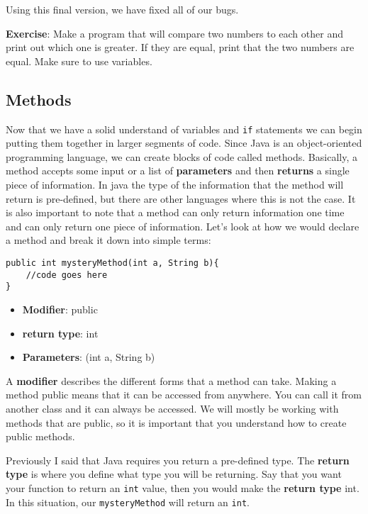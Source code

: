\documentclass[11pt,fleqn]{article}
\begin{document}
Using this final version, we have fixed all of our bugs.

\textbf{Exercise}: Make a program that will compare two numbers to each other
and print out which one is greater. If they are equal, print that the two
numbers are equal. Make sure to use variables. 

\begin{center}
\section*{Methods}
\end{center}

Now that we have a solid understand of variables and \texttt{if} statements we can
begin putting them together in larger segments of code. Since Java is an
object-oriented programming language, we can create blocks of code called
methods. Basically, a method accepts some input or a list of \textbf{parameters}
and then \textbf{returns} a single piece of information. In java the type of the
information that the method will return is pre-defined, but there are other
languages where this is not the case. It is also important to note that a method
can only return information one time and can only return one piece of
information. Let's look at how we would declare a method and break it down into
simple terms:

\begin{verbatim}
public int mysteryMethod(int a, String b){
    //code goes here
}
\end{verbatim}

\begin{itemize}
    \item
        \textbf{Modifier}: public

    \item
        \textbf{return type}: int

    \item
        \textbf{Parameters}: (int a, String b)
\end{itemize}

A \textbf{modifier} describes the different forms that a method can take. Making a method
public means that it can be accessed from anywhere. You can call it from another
class and it can always be accessed. We will mostly be working with methods that
are public, so it is important that you understand how to create public methods.

Previously I said that Java requires you return a pre-defined type. The
\textbf{return type} is where you define what type you will be returning. Say
that you want your function to return an \texttt{int} value, then you would make
the \textbf{return type} int. In this situation, our \texttt{mysteryMethod} will
return an \texttt{int}. 
\end{document}
